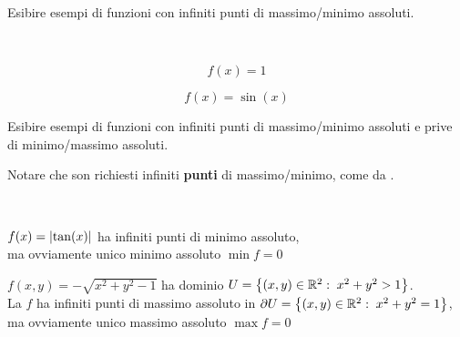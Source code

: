 \begin{exercise}
	Esibire esempi di funzioni con infiniti punti di massimo/minimo assoluti.
	\begin{solution}\hfill\\
		\begin{minipage}{0.49\linewidth}
			$$f(x) = 1$$
		\end{minipage}
		\begin{minipage}{0.49\linewidth}
			$$f(x) = \sin(x)$$
		\end{minipage}
	\end{solution}
\end{exercise}
\begin{exercise}
	\label{ex:f_con_inf_pti_max_min_abs}
	Esibire esempi di funzioni con infiniti punti di massimo/minimo assoluti e prive di minimo/massimo assoluti.
	\begin{note}
		Notare che son richiesti infiniti \textbf{punti} di massimo/minimo, come da .
	\end{note}
	\begin{solution}\hfill\\
		\vspace*{\baselineskip}
		\begin{minipage}{0.49\linewidth}
			\begin{center}
				$f(x) = \left|\tan(x)\right|$ ha infiniti punti di minimo assoluto,\\
				ma ovviamente unico minimo assoluto $\min f = 0$
			\end{center}
		\end{minipage}
		\begin{minipage}{0.49\linewidth}
			\begin{center}
				$f(x,y) = -\sqrt{x^2+y^2-1}$ ha dominio $U = \left\{(x, y) \in \mathbb{R}^2:\; x^2 + y^2 > 1\right\}$.\\
				La $f$ ha infiniti punti di massimo assoluto in $\partial U = \left\{(x, y) \in \mathbb{R}^2:\; x^2 + y^2 = 1\right\}$,\\
				ma ovviamente unico massimo assoluto $\max f = 0$
			\end{center}
		\end{minipage}\\
		\vspace*{\baselineskip}
		\begin{minipage}{0.49\linewidth}
			\begin{center}
				\resizebox{\linewidth}{!}{
					\begin{tikzpicture}
						\begin{axis} [
							axis lines = center,
							axis on top=true,
							ymax = 11, ymin = -.5
						]

\end{axis}
\end{tikzpicture}}
\end{center}
\end{minipage}
\end{solution}
\end{exercise}
